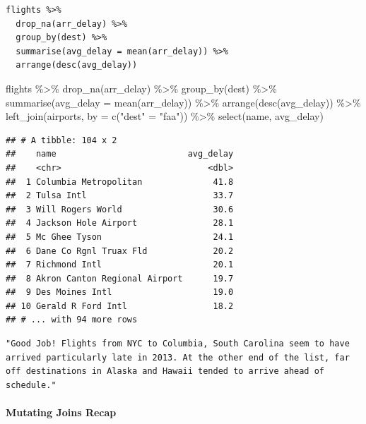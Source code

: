\documentclass[
]{article}
\newenvironment{Shaded}{\begin{snugshade}}{\end{snugshade}}
\newcommand{\AttributeTok}[1]{\textcolor[rgb]{0.77,0.63,0.00}{#1}}
\newcommand{\FunctionTok}[1]{\textcolor[rgb]{0.00,0.00,0.00}{#1}}
\newcommand{\NormalTok}[1]{#1}
\newcommand{\OtherTok}[1]{\textcolor[rgb]{0.56,0.35,0.01}{#1}}
\newcommand{\SpecialCharTok}[1]{\textcolor[rgb]{0.00,0.00,0.00}{#1}}
\newcommand{\StringTok}[1]{\textcolor[rgb]{0.31,0.60,0.02}{#1}}
\begin{document}
\begin{verbatim}
flights %>% 
  drop_na(arr_delay) %>%
  group_by(dest) %>%
  summarise(avg_delay = mean(arr_delay)) %>%
  arrange(desc(avg_delay))
\end{verbatim}

\begin{Shaded}
\begin{Highlighting}[]
\NormalTok{flights }\SpecialCharTok{\%\textgreater{}\%} 
  \FunctionTok{drop\_na}\NormalTok{(arr\_delay) }\SpecialCharTok{\%\textgreater{}\%}
  \FunctionTok{group\_by}\NormalTok{(dest) }\SpecialCharTok{\%\textgreater{}\%}
  \FunctionTok{summarise}\NormalTok{(}\AttributeTok{avg\_delay =} \FunctionTok{mean}\NormalTok{(arr\_delay)) }\SpecialCharTok{\%\textgreater{}\%}
  \FunctionTok{arrange}\NormalTok{(}\FunctionTok{desc}\NormalTok{(avg\_delay)) }\SpecialCharTok{\%\textgreater{}\%}
  \FunctionTok{left\_join}\NormalTok{(airports, }\AttributeTok{by =} \FunctionTok{c}\NormalTok{(}\StringTok{"dest"} \OtherTok{=} \StringTok{"faa"}\NormalTok{)) }\SpecialCharTok{\%\textgreater{}\%}
  \FunctionTok{select}\NormalTok{(name, avg\_delay)}
\end{Highlighting}
\end{Shaded}

\begin{verbatim}
## # A tibble: 104 x 2
##    name                          avg_delay
##    <chr>                             <dbl>
##  1 Columbia Metropolitan              41.8
##  2 Tulsa Intl                         33.7
##  3 Will Rogers World                  30.6
##  4 Jackson Hole Airport               28.1
##  5 Mc Ghee Tyson                      24.1
##  6 Dane Co Rgnl Truax Fld             20.2
##  7 Richmond Intl                      20.1
##  8 Akron Canton Regional Airport      19.7
##  9 Des Moines Intl                    19.0
## 10 Gerald R Ford Intl                 18.2
## # ... with 94 more rows
\end{verbatim}

\begin{verbatim}
"Good Job! Flights from NYC to Columbia, South Carolina seem to have arrived particularly late in 2013. At the other end of the list, far off destinations in Alaska and Hawaii tended to arrive ahead of schedule."
\end{verbatim}

\hypertarget{mutating-joins-recap}{%
\paragraph{Mutating Joins Recap}\label{mutating-joins-recap}}
\end{document}
